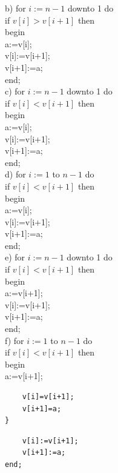 \documentclass[10pt]{article}
\begin{document}
b) for $i:=n-1$ downto 1 do\\
if $v[i]>v[i+1]$ then\\
begin\\[0pt]
a:=v[i];\\[0pt]
v[i]:=v[i+1];\\[0pt]
v[i+1]:=a;\\
end;\\
c) for $i:=n-1$ downto 1 do\\
if $v[i]<v[i+1]$ then\\
begin\\[0pt]
a:=v[i];\\[0pt]
v[i]:=v[i+1];\\[0pt]
v[i+1]:=a;\\
end;\\
d) for $i:=1$ to $n-1$ do\\
if $v[i]<v[i+1]$ then\\
begin\\[0pt]
a:=v[i];\\[0pt]
v[i]:=v[i+1];\\[0pt]
v[i+1]:=a;\\
end;\\
e) for $i:=n-1$ downto 1 do\\
if $v[i]<v[i+1]$ then\\
begin\\[0pt]
a:=v[i+1];\\[0pt]
v[i]:=v[i+1];\\[0pt]
v[i+1]:=a;\\
end;\\
f) for $i:=1$ to $n-1$ do\\
if $v[i]<v[i+1]$ then\\
begin\\[0pt]
a:=v[i+1];

\begin{verbatim}
    v[i]=v[i+1];
    v[i+1]=a;
}
\end{verbatim}

\begin{verbatim}
    v[i]:=v[i+1];
    v[i+1]:=a;
end;
\end{verbatim}
\end{document}
